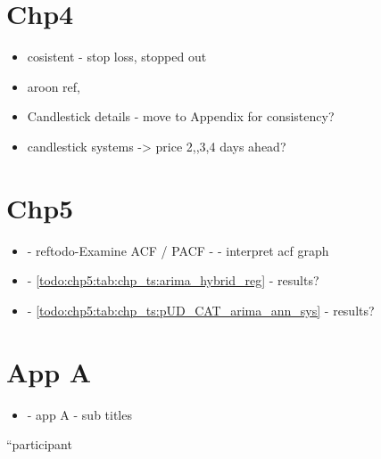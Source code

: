 \section{Chp4}
\begin{itemize}
\item cosistent - stop loss, stopped out
\item aroon ref, 
\item Candlestick details - move to Appendix for consistency?
\item candlestick systems -> price 2,,3,4 days ahead?
\end{itemize}

\section{Chp5}
\begin{itemize}
\item - ref{todo-Examine ACF / PACF} - - interpret acf graph
\item - \ref{todo:chp5:tab:chp_ts:arima_hybrid_reg} - results?
\item - \ref{todo:chp5:tab:chp_ts:pUD_CAT_arima_ann_sys} - results?
\end{itemize}

\section{App A}
\begin{itemize}
\item - app A - sub titles
\end{itemize}


\textquotedblleft participant
